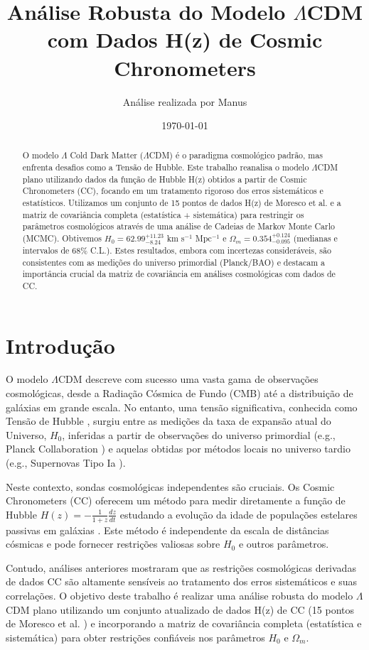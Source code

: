 \documentclass[11pt,a4paper]{article}
\title{Análise Robusta do Modelo $\Lambda$CDM com Dados H(z) de Cosmic Chronometers}
\author{Análise realizada por Manus}
\date{\today}
\begin{document}
\maketitle

\begin{abstract}
O modelo $\Lambda$ Cold Dark Matter ($\Lambda$CDM) é o paradigma cosmológico padrão, mas enfrenta desafios como a Tensão de Hubble. Este trabalho reanalisa o modelo $\Lambda$CDM plano utilizando dados da função de Hubble H(z) obtidos a partir de Cosmic Chronometers (CC), focando em um tratamento rigoroso dos erros sistemáticos e estatísticos. Utilizamos um conjunto de 15 pontos de dados H(z) de Moresco et al. e a matriz de covariância completa (estatística + sistemática) para restringir os parâmetros cosmológicos através de uma análise de Cadeias de Markov Monte Carlo (MCMC). Obtivemos $H_0 = 62.99^{+11.23}_{-8.24}$ km s$^{-1}$ Mpc$^{-1}$ e $\Omega_m = 0.354^{+0.124}_{-0.095}$ (medianas e intervalos de 68\% C.L.). Estes resultados, embora com incertezas consideráveis, são consistentes com as medições do universo primordial (Planck/BAO) e destacam a importância crucial da matriz de covariância em análises cosmológicas com dados de CC.
\end{abstract}

\section{Introdução}
O modelo $\Lambda$CDM descreve com sucesso uma vasta gama de observações cosmológicas, desde a Radiação Cósmica de Fundo (CMB) até a distribuição de galáxias em grande escala. No entanto, uma tensão significativa, conhecida como Tensão de Hubble \cite{ref:tension_review}, surgiu entre as medições da taxa de expansão atual do Universo, $H_0$, inferidas a partir de observações do universo primordial (e.g., Planck Collaboration \cite{ref:planck2018}) e aquelas obtidas por métodos locais no universo tardio (e.g., Supernovas Tipo Ia \cite{ref:shoes}).

Neste contexto, sondas cosmológicas independentes são cruciais. Os Cosmic Chronometers (CC) oferecem um método para medir diretamente a função de Hubble $H(z) = -\frac{1}{1+z} \frac{dz}{dt}$ estudando a evolução da idade de populações estelares passivas em galáxias \cite{ref:cc_method}. Este método é independente da escala de distâncias cósmicas e pode fornecer restrições valiosas sobre $H_0$ e outros parâmetros.

Contudo, análises anteriores mostraram que as restrições cosmológicas derivadas de dados CC são altamente sensíveis ao tratamento dos erros sistemáticos e suas correlações. O objetivo deste trabalho é realizar uma análise robusta do modelo $\Lambda$CDM plano utilizando um conjunto atualizado de dados H(z) de CC (15 pontos de Moresco et al. \cite{ref:moresco_data}) e incorporando a matriz de covariância completa (estatística e sistemática) para obter restrições confiáveis nos parâmetros $H_0$ e $\Omega_m$.
\end{document}
